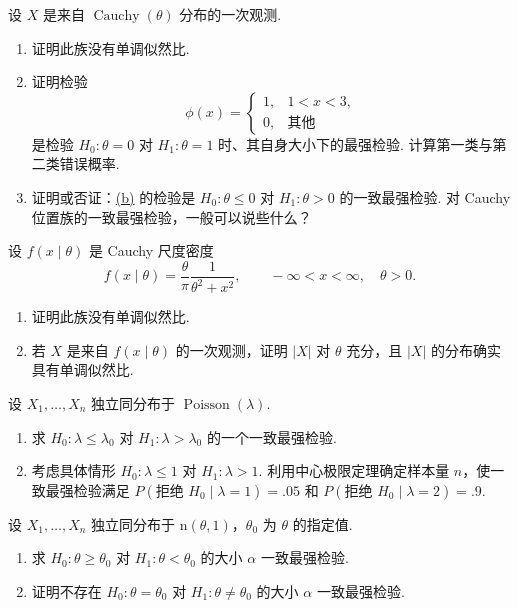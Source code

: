 \begin{exercise}\label{exercise:8.29}
设 $X$ 是来自 $\operatorname{Cauchy}(\theta)$ 分布的一次观测.
\begin{enumerate}
\item 证明此族没有单调似然比.
\item{}\label{itm:exercise:8.29:b} 证明检验
$$\phi(x)=\begin{cases}1,&1<x<3,\\0,&\text{其他}\end{cases}$$
是检验 $H_0:\theta=0$ 对 $H_1:\theta=1$ 时、其自身大小下的最强检验. 计算第一类与第二类错误概率.
\item 证明或否证：\hyperref[itm:exercise:8.29:b]{(b)} 的检验是 $H_0:\theta\le0$ 对 $H_1:\theta>0$ 的一致最强检验. 对 Cauchy 位置族的一致最强检验，一般可以说些什么？
\end{enumerate}
\end{exercise}
\begin{exercise}\label{exercise:8.30}
设 $f(x\mid\theta)$ 是 Cauchy 尺度密度
$$f(x\mid\theta)=\frac\theta\pi\frac1{\theta^2+x^2},\qquad-\infty<x<\infty,\quad\theta>0.$$
\begin{enumerate}
\item 证明此族没有单调似然比.
\item 若 $X$ 是来自 $f(x\mid\theta)$ 的一次观测，证明 $|X|$ 对 $\theta$ 充分，且 $|X|$ 的分布确实具有单调似然比.
\end{enumerate}
\end{exercise}
\begin{exercise}\label{exercise:8.31}
设 $X_1,\ldots,X_n$ 独立同分布于 $\operatorname{Poisson}(\lambda)$.
\begin{enumerate}
\item 求 $H_0:\lambda\le\lambda_0$ 对 $H_1:\lambda>\lambda_0$ 的一个一致最强检验.
\item 考虑具体情形 $H_0:\lambda\le1$ 对 $H_1:\lambda>1$. 利用中心极限定理确定样本量 $n$，使一致最强检验满足 $P(\text{拒绝 }H_0\mid\lambda=1)=.05$ 和 $P(\text{拒绝 }H_0\mid\lambda=2)=.9$.
\end{enumerate}
\end{exercise}
\begin{exercise}\label{exercise:8.32}
设 $X_1,\ldots,X_n$ 独立同分布于 $\mathrm n(\theta,1)$，$\theta_0$ 为 $\theta$ 的指定值.
\begin{enumerate}
\item 求 $H_0:\theta\ge\theta_0$ 对 $H_1:\theta<\theta_0$ 的大小 $\alpha$ 一致最强检验.
\item 证明不存在 $H_0:\theta=\theta_0$ 对 $H_1:\theta\ne\theta_0$ 的大小 $\alpha$ 一致最强检验.
\end{enumerate}
\end{exercise}
